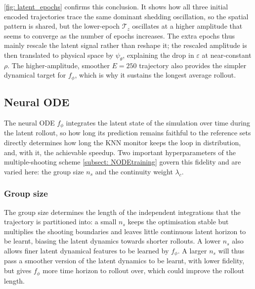 \autoref{fig: latent_epochs} confirms this conclusion. It shows how all three initial encoded trajectories trace the same dominant shedding oscillation, so the spatial pattern is shared, but the lower-epoch $\mathcal{T}_z$ oscillates at a higher amplitude that seems to converge as the number of epochs increases. The extra epochs thus mainly rescale the latent signal rather than reshape it; the rescaled amplitude is then translated to physical space by $\psi_\theta$, explaining the drop in $\varepsilon$ at near-constant $\rho$. The higher-amplitude, smoother $E = 250$ trajectory also provides the simpler dynamical target for $f_\phi$, which is why it sustains the longest average rollout.



\subsection{Neural ODE}
\label{subsect: 4_node_params}
The neural ODE $f_\phi$ integrates the latent state of the simulation over time during the latent rollout, so how long its prediction remains faithful to the reference sets directly determines how long the KNN monitor keeps the loop in distribution, and, with it, the achievable speedup. Two important hyperparameters of the multiple-shooting scheme \autoref{subsect: NODEtraining} govern this fidelity and are varied here: the group size $n_s$ and the continuity weight $\lambda_c$. 

\subsubsection{Group size}
The group size determines the length of the independent integrations that the trajectory is partitioned into: a small $n_s$ keeps the optimisation stable but multiplies the shooting boundaries and leaves little continuous latent horizon to be learnt, biasing the latent dynamics towards shorter rollouts. A lower $n_s$ also allows finer latent dynamical features to be learned by $f_\phi$. A larger $n_s$ will thus pass a smoother version of the latent dynamics to be learnt, with lower fidelity, but gives $f_\phi$ more time horizon to rollout over, which could improve the rollout length. 

